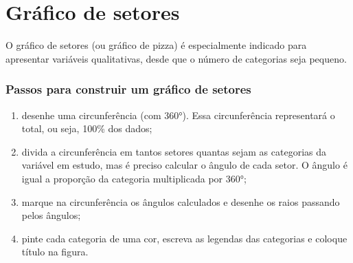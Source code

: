 \documentclass[11pt,fleqn]{book} %
\begin{document}

\section{Gráfico de setores}

O gráfico de setores (ou gráfico de pizza) é especialmente indicado para apresentar variáveis qualitativas, desde que o número de categorias seja pequeno.


\subsubsection{Passos para construir um gráfico de setores} 


\begin{enumerate}
\item desenhe uma circunferência (com 360°). Essa circunferência representará o total, ou seja, 100\% dos dados;

\item divida a circunferência em tantos setores quantas sejam as categorias da variável em estudo, mas é preciso calcular o ângulo de cada setor. O ângulo é igual a proporção da categoria multiplicada por 360°;

\item marque na circunferência os ângulos calculados e desenhe os raios passando pelos ângulos;

\item pinte cada categoria de uma cor, escreva as legendas das categorias e coloque título na figura. \\

\end{enumerate}
\end{document}
